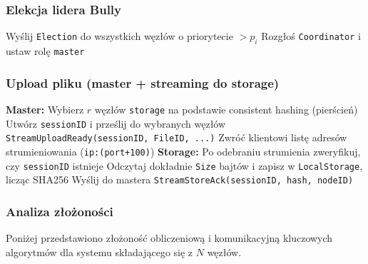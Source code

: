 \documentclass[12pt,a4paper]{article}
\begin{document}
	\subsubsection{Elekcja lidera Bully}
	\begin{algorithm}[H]
		Wyślij \texttt{Election} do wszystkich węzłów o priorytecie $> p_i$\;
		Rozgłoś \texttt{Coordinator} i ustaw rolę \texttt{master}\;
		\caption{Algorytm elekcji lidera Bully.}
	\end{algorithm}

	\subsubsection{Upload pliku (master + streaming do storage)}
	\begin{algorithm}[H]
		\textbf{Master:}\;
		Wybierz $r$ węzłów \texttt{storage} na podstawie consistent hashing (pierścień)\;
		Utwórz \texttt{sessionID} i prześlij do wybranych węzłów \texttt{StreamUploadReady(sessionID, FileID, ...)}\;
		Zwróć klientowi listę adresów strumieniowania (\texttt{ip:(port+100)})\;
		\BlankLine
		\textbf{Storage:}\;
		Po odebraniu strumienia zweryfikuj, czy \texttt{sessionID} istnieje\;
		Odczytaj dokładnie \texttt{Size} bajtów i zapisz w \texttt{LocalStorage}, licząc SHA256\;
		Wyślij do mastera \texttt{StreamStoreAck(sessionID, hash, nodeID)}\;
		\caption{Przepływ uploadu przez protokół streaming.}
	\end{algorithm}
	
	\subsubsection{Analiza złożoności}
	Poniżej przedstawiono złożoność obliczeniową i komunikacyjną kluczowych algorytmów dla systemu składającego się z $N$ węzłów.
	
\end{document}
